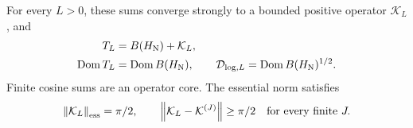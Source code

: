 \begin{theorem}\label{boundary:operator}
For every $L>0$, these sums converge strongly to a bounded positive
operator $\mathcal K_L$, and
\begin{equation}\label{boundary:domains}
\begin{split}
T_L&=B(H_{\rm N})+\mathcal K_L,\\
\operatorname{Dom} T_L&=\operatorname{Dom} B(H_{\rm N}),\qquad
\mathcal D_{\log,L}=\operatorname{Dom} B(H_{\rm N})^{1/2}.
\end{split}
\end{equation}
Finite cosine sums are an operator core. The essential norm satisfies
\begin{equation}\label{boundary:essential}
\left\lVert\mathcal K_L\right\rVert_{\rm ess}=\pi/2,
\qquad \left\lVert\mathcal K_L-\mathcal K^{(J)}\right\rVert\ge\pi/2
\quad\text{for every finite }J.
\end{equation}
\end{theorem}
